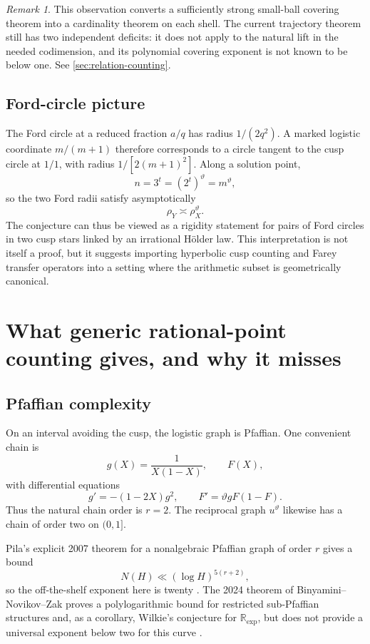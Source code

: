 \documentclass[10pt,oneside]{article}
\theoremstyle{definition}
\theoremstyle{remark}
\newtheorem{remark}[theorem]{Remark}
\newcommand{\R}{\mathbb R}
\newcommand{\thetaq}{\vartheta}
\begin{document}
\begin{remark}
This observation converts a sufficiently strong small-ball covering theorem into a cardinality theorem on each shell.  The current trajectory theorem still has two independent deficits: it does not apply to the natural lift in the needed codimension, and its polynomial covering exponent is not known to be below one.  See \cref{sec:relation-counting}.
\end{remark}

\subsection{Ford-circle picture}
The Ford circle at a reduced fraction \(a/q\) has radius \(1/(2q^2)\).  A marked logistic coordinate \(m/(m+1)\) therefore corresponds to a circle tangent to the cusp circle at \(1/1\), with radius \(1/[2(m+1)^2]\).  Along a solution point,
\[
 n=3^t=(2^t)^{\thetaq}=m^{\thetaq},
\]
so the two Ford radii satisfy asymptotically
\[
 \rho_Y\asymp \rho_X^{\thetaq}.
\]
The conjecture can thus be viewed as a rigidity statement for pairs of Ford circles in two cusp stars linked by an irrational Hölder law.  This interpretation is not itself a proof, but it suggests importing hyperbolic cusp counting and Farey transfer operators into a setting where the arithmetic subset is geometrically canonical.

\section{What generic rational-point counting gives, and why it misses}
\label{sec:generic-counting}

\subsection{Pfaffian complexity}
On an interval avoiding the cusp, the logistic graph is Pfaffian.  One convenient chain is
\[
 g(X)=\frac1{X(1-X)},
 \qquad
 F(X),
\]
with differential equations
\[
 g'=-(1-2X)g^2,
 \qquad
 F'=\thetaq gF(1-F).
\]
Thus the natural chain order is \(r=2\).  The reciprocal graph \(u^{\thetaq}\) likewise has a chain of order two on \((0,1]\).

Pila's explicit 2007 theorem for a nonalgebraic Pfaffian graph of order \(r\) gives a bound
\[
 N(H)\ll(\log H)^{5(r+2)},
\]
so the off-the-shelf exponent here is twenty \cite{Pila2007}.  The 2024 theorem of Binyamini--Novikov--Zak proves a polylogarithmic bound for restricted sub-Pfaffian structures and, as a corollary, Wilkie's conjecture for \(\R_{\exp}\), but does not provide a universal exponent below two for this curve \cite{BNZ2024}.
\end{document}
